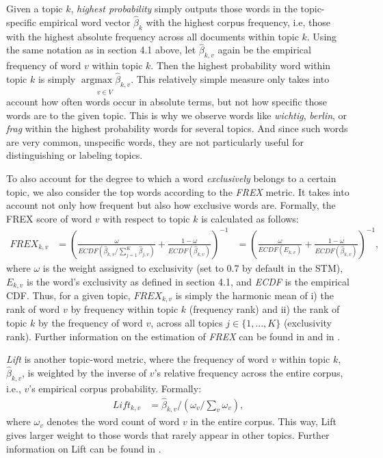 Given a topic $k$, \textit{highest probability} simply outputs those words in the topic-specific empirical word vector $\hat{\beta}_{k}$ with the highest corpus frequency, i.e, those with the highest absolute frequency across all documents within topic $k$. Using the same notation as in section 4.1 above, let $\hat{\beta}_{k,v}$ again be the empirical frequency of word $v$ within topic $k$. Then the highest probability word within topic $k$ is simply $\underset{v \in V}{\operatorname{argmax}\hat{\beta}_{k,v}}$. This relatively simple measure only takes into account how often words occur in absolute terms, but not how specific those words are to the given topic. This is why we observe words like \textit{wichtig}, \textit{berlin}, or \textit{frag} within the highest probability words for several topics. And since such words are very common, unspecific words, they are not particularly useful for distinguishing or labeling topics.

To also account for the degree to which a word \textit{exclusively} belongs to a certain topic, we also consider the top words according to the \textit{FREX} metric. It takes into account not only how frequent but also how exclusive words are. Formally, the FREX score of word $v$ with respect to topic $k$ is calculated as follows:
\begin{align*}
FREX_{k,v} &= (\frac{\omega}{ECDF(\hat{\beta}_{k,v}/\sum_{j=1}^{K}\hat{\beta}_{j,v})} + \frac{1-\omega}{ECDF(\hat{\beta}_{k,v})})^{-1} &= (\frac{\omega}{ECDF(E_{k,v})} + \frac{1-\omega}{ECDF(\hat{\beta}_{k,v})})^{-1},
\end{align*}
where $\omega$ is the weight  assigned to exclusivity (set to 0.7 by default in the STM), $E_{k,v}$ is the word's exclusivity as defined in section 4.1, and \textit{ECDF} is the empirical CDF. Thus, for a given topic, $FREX_{k,v}$ is simply the harmonic mean of i) the rank of word $v$ by frequency within topic $k$ (frequency rank) and ii) the rank of topic $k$ by the frequency of word $v$, across all topics $j \in \{1,...,K\}$ (exclusivity rank). Further information on the estimation of \textit{FREX} can be found in \cite{stm} and in \cite{bischof2012summarizing}.

\textit{Lift} is another topic-word metric, where the frequency of word $v$ within topic $k$,  $\hat{\beta}_{k,v}$, is weighted by the inverse of $v$'s relative frequency across the entire corpus, i.e., $v$'s empirical corpus probability. Formally:
\begin{align*}
Lift_{k,v} &= \hat{\beta}_{k,v}/(\omega_{v}/\sum_{v}\omega_{v}),
\end{align*}
where $\omega_{v}$ denotes the word count of word $v$ in the entire corpus. This way, Lift gives larger weight to those words that rarely appear in other topics. Further information on Lift can be found in \cite{taddy2012estimation}.

